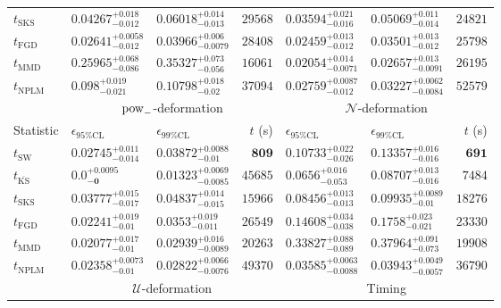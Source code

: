 \begin{tabular}{l|llr|llr}
	$t_{\mathrm{SKS}}$ & $0.04267_{-0.012}^{+0.018}$ & $0.06018_{-0.013}^{+0.014}$ & $29568$ & $0.03594_{-0.016}^{+0.021}$ & $0.05069_{-0.014}^{+0.011}$ & $24821$ \\
	$t_{\mathrm{FGD}}$ & ${\mathbf{0.02641_{-0.012}^{+0.0058}}}$ & ${\mathbf{0.03966_{-0.0079}^{+0.006}}}$ & $28408$ & $0.02459_{-0.012}^{+0.013}$ & $0.03501_{-0.012}^{+0.013}$ & $25798$ \\
	$t_{\mathrm{MMD}}$ & $0.25965_{-0.086}^{+0.068}$ & $0.35327_{-0.056}^{+0.073}$ & $16061$ & $0.02054_{-0.0071}^{+0.014}$ & $0.02657_{-0.0091}^{+0.013}$ & $26195$ \\
\rowcolor{red!35}	$t_{\mathrm{NPLM}}$ & $0.098_{-0.021}^{+0.019}$ & $0.10798_{-0.02}^{+0.018}$ & $37094$ & $0.02759_{-0.012}^{+0.0087}$ & $0.03227_{-0.0084}^{+0.0062}$ & $52579$ \\
	\toprule
	\multicolumn{1}{c}{} & \multicolumn{3}{c}{$\rm{pow}_{-}$-deformation} & \multicolumn{3}{c}{$\mathcal{N}$-deformation} \\
Statistic & $\epsilon_{95\%\mathrm{CL}}$ & $\epsilon_{99\%\mathrm{CL}}$ & $t$ (s) & $\epsilon_{95\%\mathrm{CL}}$ & $\epsilon_{99\%\mathrm{CL}}$ & $t$ (s) \\
	\midrule
	$t_{\mathrm{SW}}$ & $0.02745_{-0.014}^{+0.011}$ & $0.03872_{-0.01}^{+0.0088}$ & ${\mathbf{809}}$ & $0.10733_{-0.026}^{+0.022}$ & $0.13357_{-0.016}^{+0.016}$ & ${\mathbf{691}}$ \\
	$t_{\overline{\mathrm{KS}}}$ & ${\mathbf{0.0_{-0}^{+0.0095}}}$ & ${\mathbf{0.01323_{-0.0085}^{+0.0069}}}$ & $45685$ & ${\mathbf{0.0656_{-0.053}^{+0.016}}}$ & ${\mathbf{0.08707_{-0.016}^{+0.013}}}$ & $7484$ \\
	$t_{\mathrm{SKS}}$ & $0.03777_{-0.017}^{+0.015}$ & $0.04837_{-0.015}^{+0.014}$ & $15966$ & $0.08456_{-0.013}^{+0.013}$ & $0.09935_{-0.01}^{+0.0089}$ & $18276$ \\
	$t_{\mathrm{FGD}}$ & $0.02241_{-0.01}^{+0.019}$ & $0.0353_{-0.011}^{+0.019}$ & $26549$ & $0.14608_{-0.038}^{+0.034}$ & $0.1758_{-0.021}^{+0.023}$ & $23330$ \\
	$t_{\mathrm{MMD}}$ & $0.02077_{-0.01}^{+0.017}$ & $0.02939_{-0.0089}^{+0.016}$ & $20263$ & $0.33827_{-0.089}^{+0.088}$ & $0.37964_{-0.073}^{+0.091}$ & $19908$ \\
\rowcolor{red!35}	$t_{\mathrm{NPLM}}$ & $0.02358_{-0.01}^{+0.0073}$ & $0.02822_{-0.0076}^{+0.0066}$ & $49370$ & $0.03585_{-0.0088}^{+0.0063}$ & $0.03943_{-0.0057}^{+0.0049}$ & $36790$ \\
	\toprule
	\multicolumn{1}{c}{} & \multicolumn{3}{c}{$\mathcal{U}$-deformation} & \multicolumn{3}{c}{Timing} \\

\end{tabular}
